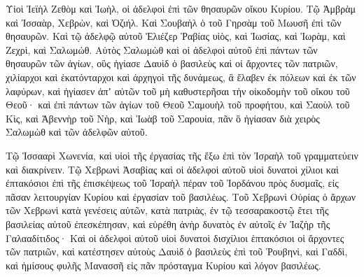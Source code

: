 {Υἱοὶ Ἰεϊὴλ Ζεθὸμ καὶ Ἰωὴλ, οἱ ἀδελφοὶ ἐπὶ τῶν θησαυρῶν οἴκου Κυρίου.
Τῷ Ἀμβρὰμ καὶ Ἰσσαὰρ, Χεβρὼν, καὶ Ὀζιήλ.
Καὶ Σουβαὴλ ὁ τοῦ Γηρσὰμ τοῦ Μωυσῆ ἐπὶ τῶν θησαυρῶν.
Καὶ τῷ ἀδελφῷ αὐτοῦ Ἐλιέζερ Ῥαβίας υἱὸς, καὶ Ἰωσίας, καὶ Ἰωρὰμ, καὶ Ζεχρὶ, καὶ Σαλωμώθ.
Αὐτὸς Σαλωμὼθ καὶ οἱ ἀδελφοὶ αὐτοῦ ἐπὶ πάντων τῶν θησαυρῶν τῶν ἁγίων, οὓς ἡγίασε Δαυὶδ ὁ βασιλεὺς καὶ οἱ ἄρχοντες τῶν πατριῶν, χιλίαρχοι καὶ ἑκατόνταρχοι καὶ ἀρχηγοὶ τῆς δυνάμεως,
ἃ ἔλαβεν ἐκ πόλεων καὶ ἐκ τῶν λαφύρων, καὶ ἡγίασεν ἀπʼ αὐτῶν τοῦ μὴ καθυστερῆσαι τὴν οἰκοδομὴν τοῦ οἴκου τοῦ Θεοῦ·
καὶ ἐπὶ πάντων τῶν ἁγίων τοῦ Θεοῦ Σαμουὴλ τοῦ προφήτου, καὶ Σαοὺλ τοῦ Κὶς, καὶ Ἀβεννὴρ τοῦ Νὴρ, καὶ Ἰωὰβ τοῦ Σαρουία, πᾶν ὃ ἡγίασαν διὰ χειρὸς Σαλωμὼθ καὶ τῶν ἀδελφῶν αὐτοῦ.
\par }{\PP {}Τῷ Ἰσσααρὶ Χωνενία, καὶ υἱοὶ τῆς ἐργασίας τῆς ἔξω ἐπὶ τὸν Ἰσραὴλ τοῦ γραμματεύειν καὶ διακρίνειν.
Τῷ Χεβρωνὶ Ἀσαβίας καὶ οἱ ἀδελφοὶ αὐτοῦ υἱοὶ δυνατοὶ χίλιοι καὶ ἐπτακόσιοι ἐπὶ τῆς ἐπισκέψεως τοῦ Ἰσραὴλ πέραν τοῦ Ἰορδάνου πρὸς δυσμαῖς, εἰς πᾶσαν λειτουργίαν Κυρίου καὶ ἐργασίαν τοῦ βασιλέως.
Τοῦ Χεβρωνὶ Οὐρίας ὁ ἄρχων τῶν Χεβρωνὶ κατὰ γενέσεις αὐτῶν, κατὰ πατριὰς, ἐν τῷ τεσσαρακοστῷ ἔτει τῆς βασιλείας αὐτοῦ ἐπεσκέπησαν, καὶ εὑρέθη ἀνὴρ δυνατὸς ἐν αὐτοῖς ἐν Ἰαζὴρ τῆς Γαλααδίτιδος·
Καὶ οἱ ἀδελφοὶ αὐτοῦ υἱοὶ δυνατοὶ δισχίλιοι ἑπτακόσιοι οἱ ἄρχοντες τῶν πατριῶν, καὶ κατέστησεν αὐτοὺς Δαυὶδ ὁ βασιλεὺς ἐπὶ τοῦ Ῥουβηνὶ, καὶ Γαδδὶ, καὶ ἡμίσους φυλῆς Μανασσῆ εἰς πᾶν πρόσταγμα Κυρίου καὶ λόγον βασιλέως.

}
